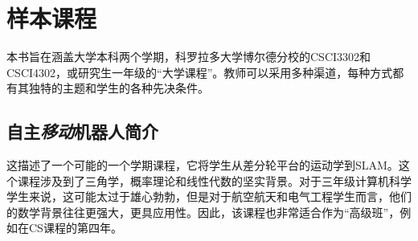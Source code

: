 

\chapter{样本课程}

本书旨在涵盖大学本科两个学期，科罗拉多大学博尔德分校的CSCI3302和CSCI4302，或研究生一年级的“大学课程”。教师可以采用多种渠道，每种方式都有其独特的主题和学生的各种先决条件。
 


\section{自主\emph{移动}机器人简介}
这描述了一个可能的一个学期课程，它将学生从差分轮平台的运动学到SLAM。这个课程涉及到了三角学，概率理论和线性代数的坚实背景。对于三年级计算机科学学生来说，这可能太过于雄心勃勃，但是对于航空航天和电气工程学生而言，他们的数学背景往往更强大，更具应用性。因此，该课程也非常适合作为“高级班”，例如在CS课程的第四年。


